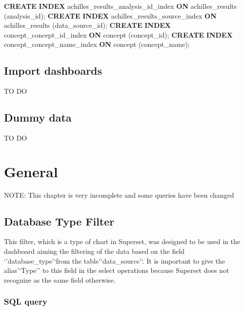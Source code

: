 \documentclass[]{book}
\newenvironment{Shaded}{\begin{snugshade}}{\end{snugshade}}
\newcommand{\KeywordTok}[1]{\textcolor[rgb]{0.13,0.29,0.53}{\textbf{#1}}}
\newcommand{\NormalTok}[1]{#1}
\begin{document}
\begin{enumerate}
\begin{Shaded}
\begin{Highlighting}[]
\KeywordTok{CREATE} \KeywordTok{INDEX}\NormalTok{ achilles_results_analysis_id_index }\KeywordTok{ON} 
\NormalTok{    achilles_results (analysis_id);}
\KeywordTok{CREATE} \KeywordTok{INDEX}\NormalTok{ achilles_results_source_index }\KeywordTok{ON}\NormalTok{ achilles_results }
\NormalTok{    (data_source_id);}
\KeywordTok{CREATE} \KeywordTok{INDEX}\NormalTok{ concept_concept_id_index }\KeywordTok{ON}\NormalTok{ concept (concept_id);}
\KeywordTok{CREATE} \KeywordTok{INDEX}\NormalTok{ concept_concept_name_index }\KeywordTok{ON}\NormalTok{ concept }
\NormalTok{    (concept_name);}
\end{Highlighting}
\end{Shaded}
\end{enumerate}

\section{Import dashboards}\label{import-dashboards}

TO DO

\section{Dummy data}\label{dummy-data}

TO DO

\chapter{General}\label{general}

NOTE: This chapter is very incomplete and some queries have been changed

\section{Database Type Filter}\label{database-type-filter}

This filter, which is a type of chart in Superset, was designed to be
used in the dashboard aiming the filtering of the data based on the
field `'database\_type'`from the table'`data\_source'`. It is important
to give the alias'`Type'' to this field in the select operations because
Superset does not recognize as the same field otherwise.

\subsection{SQL query}\label{sql-query}
\end{document}
